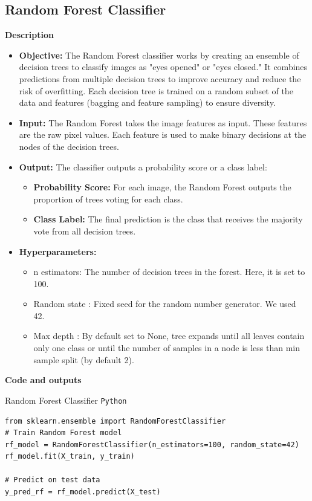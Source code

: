 \documentclass{modeleRapport}
\begin{document}
\newpage

\subsection{Random Forest Classifier}

\bigskip

\textbf{Description\\}

\begin{itemize}
    \item \textbf{Objective:} The Random Forest classifier works by creating an ensemble of decision trees to classify images as "eyes opened" or "eyes closed." 
    It combines predictions from multiple decision trees to improve accuracy and reduce the risk of overfitting.
    Each decision tree is trained on a random subset of the data and features (bagging and feature sampling) to ensure diversity.

    \item \textbf{Input:} The Random Forest takes the image features as input. These features are the raw pixel values. Each feature is used to make binary decisions at the nodes of the decision trees.

    \item \textbf{Output:} The classifier outputs a probability score or a class label:
    \begin{itemize}
        \item \textbf{Probability Score:} For each image, the Random Forest outputs the proportion of trees voting for each class.
        \item \textbf{Class Label:} The final prediction is the class that receives the majority vote from all decision trees.
    \end{itemize}

    \item \textbf{Hyperparameters:}
    \begin{itemize}
        \item n estimators: The number of decision trees in the forest. Here, it is set to 100.
        \item Random state : Fixed seed for the random number generator. We used 42.
        \item Max depth : By default set to None, tree expands until all leaves contain only one class or until the number of samples in a node is less than min sample split (by default 2).
    \end{itemize}
    
   
\end{itemize}
\bigskip
\textbf{Code and outputs\\}
\begin{codebox}[RF Classifier]{Random Forest Classifier \texttt{Python}}
\begin{lstlisting}
from sklearn.ensemble import RandomForestClassifier
# Train Random Forest model
rf_model = RandomForestClassifier(n_estimators=100, random_state=42)
rf_model.fit(X_train, y_train)

# Predict on test data
y_pred_rf = rf_model.predict(X_test)
\end{lstlisting}
\end{codebox}
\end{document}
